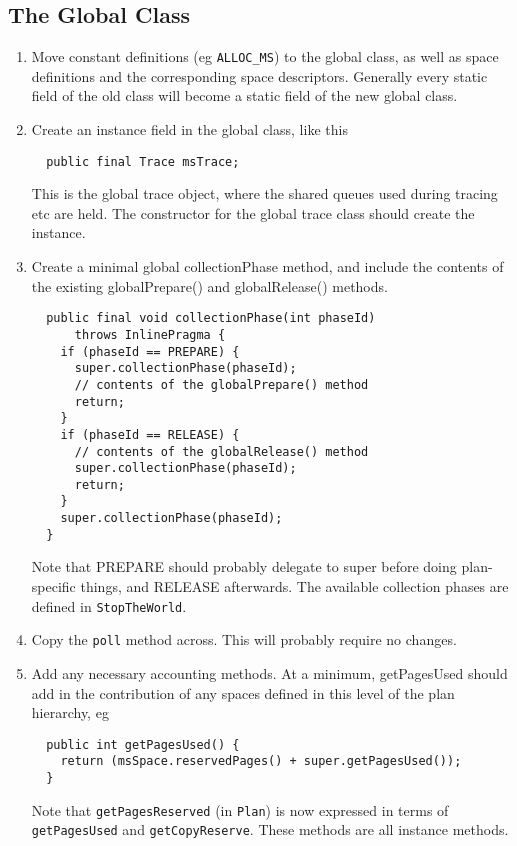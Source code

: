 \documentclass[10pt]{article}
\newcommand{\code}[1]{\lstinline!#1!}
\begin{document}
\subsection{The Global Class}
\begin{enumerate}
\item Move constant definitions (eg \code{ALLOC_MS}) to the global
  class, as well as space definitions and the corresponding space
  descriptors.  Generally every static field of the old class will
  become a static field of the new global class.

\item Create an instance field in the global class, like this
\begin{lstlisting}
  public final Trace msTrace;
\end{lstlisting}


This is the global trace object, where the shared queues used during
tracing etc are held.  The constructor for the global trace class
should create the instance.

\item Create a minimal global collectionPhase method, and include the
  contents of the existing globalPrepare() and globalRelease() methods.
\begin{lstlisting}
  public final void collectionPhase(int phaseId) 
      throws InlinePragma {
    if (phaseId == PREPARE) {
      super.collectionPhase(phaseId);
      // contents of the globalPrepare() method
      return;
    }
    if (phaseId == RELEASE) {
      // contents of the globalRelease() method
      super.collectionPhase(phaseId);
      return;
    }
    super.collectionPhase(phaseId);
  }
\end{lstlisting}
  Note that PREPARE should probably delegate to super before doing
  plan-specific things, and RELEASE afterwards.  The available
  collection phases are defined in \code{StopTheWorld}.

\item Copy the \code{poll} method across.  This will probably require
  no changes.

\item Add any necessary accounting methods.  At a minimum,
  getPagesUsed should add in the contribution of any spaces defined 
  in this level of the plan hierarchy, eg
\begin{lstlisting}
  public int getPagesUsed() {
    return (msSpace.reservedPages() + super.getPagesUsed());
  }
\end{lstlisting}
  Note that \code{getPagesReserved} (in \code{Plan}) is now 
  expressed in terms of \code{getPagesUsed} and
  \code{getCopyReserve}.  These methods are all instance methods.
\end{enumerate}
\end{document}

